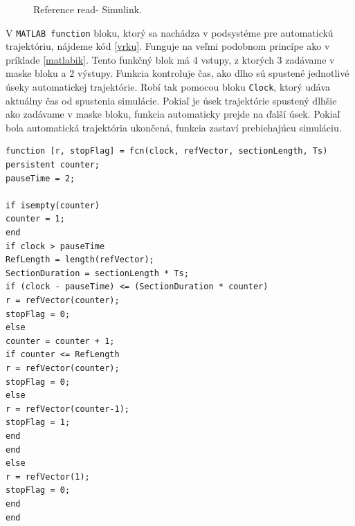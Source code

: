 \begin{figure}[!tbh]
	\hfill
	\hfill
	\hfill
	\caption{Reference read- Simulink.}\label{OBRAZOK 2.6.5}
\end{figure}

V \verb|MATLAB function| bloku, ktorý sa nachádza v podsystéme pre automatickú trajektóriu, nájdeme kód \ref{vrku}. Funguje na veľmi podobnom princípe ako v príklade \ref{matlabik}. Tento funkčný blok má 4 vstupy, z ktorých 3 zadávame v maske bloku a 2 výstupy. Funkcia kontroluje čas, ako dlho sú spustené jednotlivé úseky automatickej trajektórie. Robí tak pomocou bloku \verb|Clock|, ktorý udáva aktuálny čas od spustenia simulácie. Pokiaľ je úsek trajektórie spustený dlhšie ako zadávame v maske bloku, funkcia automaticky prejde na ďalší úsek. Pokiaľ bola automatická trajektória ukončená, funkcia zastaví prebiehajúcu simuláciu. 



\begin{lstlisting}[caption={MATLAB function blok autiomatická trajektoria.},captionpos=b, label=vrku]
function [r, stopFlag] = fcn(clock, refVector, sectionLength, Ts)
persistent counter;
pauseTime = 2;

if isempty(counter)
counter = 1;
end
if clock > pauseTime
RefLength = length(refVector);
SectionDuration = sectionLength * Ts;
if (clock - pauseTime) <= (SectionDuration * counter)
r = refVector(counter);
stopFlag = 0;
else
counter = counter + 1;
if counter <= RefLength
r = refVector(counter);
stopFlag = 0;
else
r = refVector(counter-1);
stopFlag = 1; 
end
end
else
r = refVector(1);
stopFlag = 0;
end
end
\end{lstlisting}

